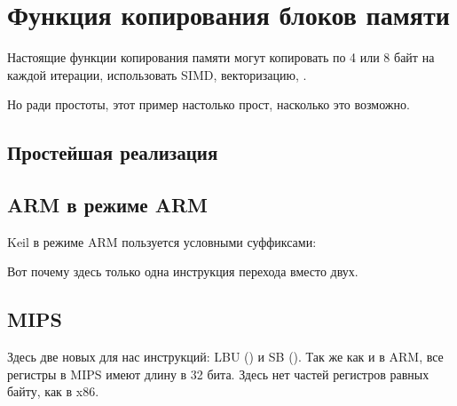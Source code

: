 ﻿\section{Функция копирования блоков памяти}
\label{loop_memcpy}

Настоящие функции копирования памяти могут копировать по 4 или 8 байт на каждой итерации, использовать \ac{SIMD},
векторизацию, \etc{}.

Но ради простоты, этот пример настолько прост, насколько это возможно.



\subsection{Простейшая реализация}



\ifdefined\IncludeARM





\subsection{ARM в режиме ARM}

Keil в режиме ARM пользуется условными суффиксами:



Вот почему здесь только одна инструкция перехода вместо двух.

\fi

\ifdefined\IncludeMIPS
\subsection{MIPS}



Здесь две новых для нас инструкций:
 LBU () и SB ().
Так же как и в ARM, все регистры в MIPS имеют длину в 32 бита. Здесь нет частей регистров равных байту,
как в x86.

